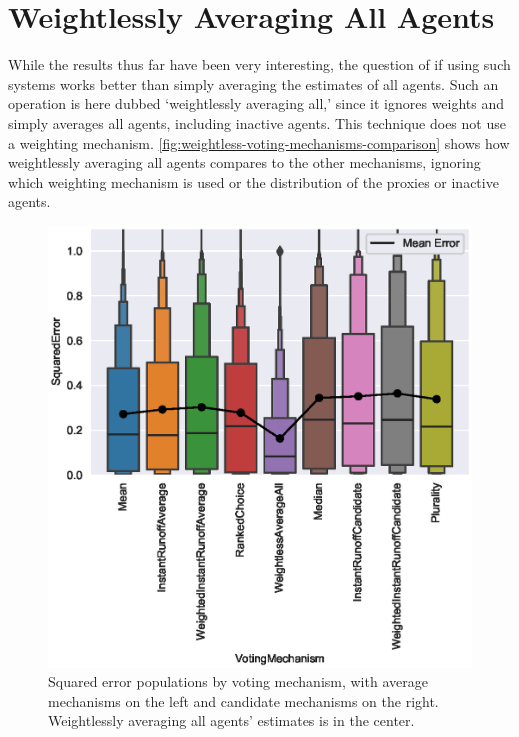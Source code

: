 \section{Weightlessly Averaging All Agents}\label{sec:weightless-average-all}
While the results thus far have been very interesting, the question of if using such
systems works better than simply averaging the estimates of all agents.
Such an operation is here dubbed `weightlessly averaging all,' since it ignores
weights and simply averages all agents, including inactive agents.
This technique does not use a weighting mechanism.
\autoref{fig:weightless-voting-mechanisms-comparison} shows how weightlessly
averaging all agents compares to the other mechanisms, ignoring which weighting
mechanism is used or the distribution of the proxies or inactive agents.

\begin{figure}[htbp]
    \centering
    \includegraphics[scale=0.75]
    {./content/figures/weightless/weightless_voting_mechanisms_comparison}
    \caption{Squared error populations by voting mechanism, with average
    mechanisms on the left and candidate mechanisms on the right.
    Weightlessly averaging all agents' estimates is in the center.}
    \label{fig:weightless-voting-mechanisms-comparison}
\end{figure}

